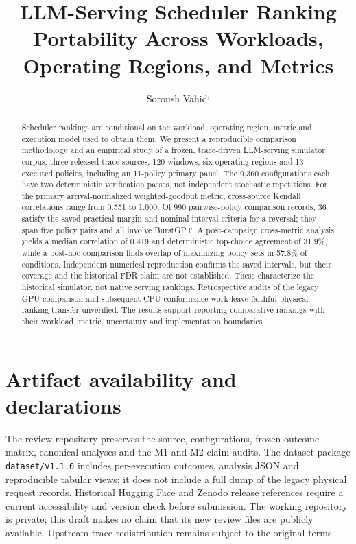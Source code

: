 \documentclass[acmsmall,screen]{acmart}
\title{LLM-Serving Scheduler Ranking Portability Across Workloads, Operating Regions, and Metrics}
\author{Soroush Vahidi}
\affiliation{\institution{New Jersey Institute of Technology}\city{Newark}\state{New Jersey}\country{USA}}
\begin{document}
\begin{abstract}
Scheduler rankings are conditional on the workload, operating region,
metric and execution model used to obtain them. We present a reproducible
comparison methodology and an empirical study of a frozen, trace-driven
LLM-serving simulator corpus: three released trace sources, 120 windows,
six operating regions and 13 executed policies, including an 11-policy
primary panel. The 9,360 configurations each have two deterministic
verification passes, not independent stochastic repetitions. For the
primary arrival-normalized weighted-goodput metric, cross-source Kendall
correlations range from 0.551 to 1.000. Of 990 pairwise-policy comparison
records, 36 satisfy the saved practical-margin and nominal interval criteria for
a reversal; they span five policy pairs and all involve BurstGPT.
A post-campaign cross-metric analysis yields a median correlation of 0.419
and deterministic top-choice agreement of 31.9\%, while a post-hoc comparison finds overlap of maximizing policy sets in
57.8\% of conditions. Independent numerical reproduction confirms the saved
intervals, but their coverage and the historical FDR claim are not established. These characterize the historical
simulator, not native serving rankings. Retrospective audits of the legacy
GPU comparison and subsequent CPU conformance work leave faithful physical
ranking transfer unverified. The results support reporting comparative
rankings with their workload, metric, uncertainty and implementation boundaries.
\end{abstract}
\maketitle











\section*{Artifact availability and declarations}\label{sec:artifact}
The review repository preserves the source, configurations, frozen outcome
matrix, canonical analyses and the M1 and M2 claim audits. The dataset package
\texttt{dataset/v1.1.0} includes per-execution outcomes, analysis JSON and
reproducible tabular views; it does not include a full dump of the legacy
physical request records. Historical Hugging Face and Zenodo release
references require a current accessibility and version check before submission.
The working repository is private; this draft makes no claim that its new
review files are publicly available. Upstream trace redistribution remains
subject to the original terms.
\end{document}
